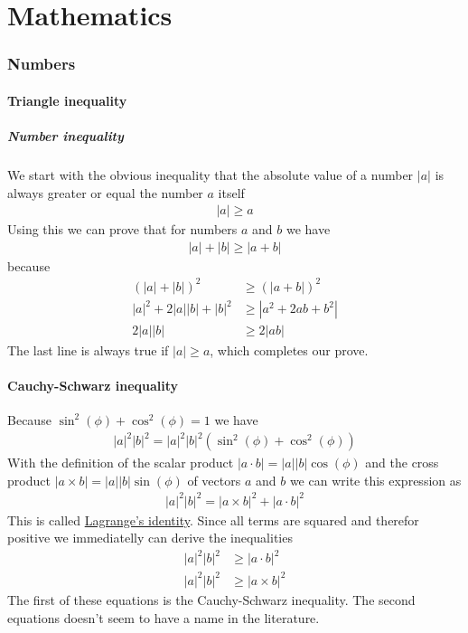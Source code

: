 \part{Mathematics}
\section{Numbers}

\subsection{Triangle inequality}

\subsubsection{Number inequality}

We start with the obvious inequality that the absolute value of a number
$\left|a\right|$ is always greater or equal the number $a$ itself 
\begin{align}
|a| \geq a
\end{align} 
Using this we can prove that for numbers $a$ and $b$ we have 
\begin{align}
|a| + |b|  \geq |a+b|
\end{align} 
because 
\begin{align}
(|a| + |b|)^2  &\geq (|a+b|)^2 \\
|a|^2  + 2|a||b| + |b|^2 &\geq |a^2 + 2ab + b^2| \\
2|a||b| &\geq 2|ab|
\end{align} 
The last line is always true if $|a| \geq a$, which completes our
prove. 

\subsection{Cauchy-Schwarz inequality} 
Because
$\sin^2(\phi) + \cos^2(\phi) = 1$ we have 
\begin{align}
|a|^2|b|^2 = |a|^2|b|^2 (\sin^2(\phi) + \cos^2(\phi))
\end{align} 
With the definition of the scalar product
$|a\cdot b| = |a||b|\cos(\phi)$ and the cross product
$|a\times b| = |a||b|\sin(\phi)$ of vectors $a$ and $b$ we can
write this expression as 
\begin{align}
|a|^2|b|^2 = |a\times b|^2 + |a\cdot b|^2 
\label{eq:lagrident}
\end{align} 
This is called \href{https://en.wikipedia.org/wiki/Lagrange\%27s_identity}{Lagrange's identity}. Since all terms are squared and
therefor positive we immediatelly can derive the inequalities 
\begin{align}
|a|^2|b|^2 &\geq |a\cdot b|^2 \\
|a|^2|b|^2 &\geq |a\times b|^2
\end{align} 
The first of these equations is the Cauchy-Schwarz inequality. The
second equations doesn't seem to have a name in the literature.

